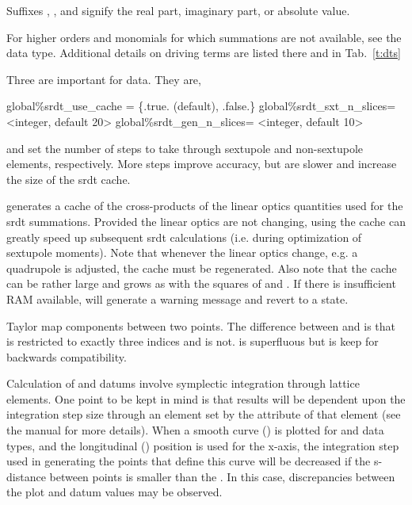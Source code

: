 \begin{description}
{  Suffixes , , and  signify the real part, imaginary part, or absolute value.

  For higher orders and monomials for which summations are not available, see the \Newline
   data type.
  Additional details on driving terms are listed there and in Tab.~\ref{t:dts}

  Three   are important for  data.  They are,
  \begin{example}
  global{\%}srdt_use_cache = \{.true. (default), .false.\}
  global{\%}srdt_sxt_n_slices= <integer, default 20>
  global{\%}srdt_gen_n_slices= <integer, default 10>
  \end{example}

   and  set the number of steps to take through
  sextupole and non-sextupole elements, respectively.  More steps improve accuracy, but are slower
  and increase the size of the srdt cache.

   generates a cache of the cross-products of the linear optics quantities used
  for the srdt summations.  Provided the linear optics are not changing, using the cache can greatly 
  speed up subsequent srdt calculations (i.e. during optimization of sextupole moments).  
  Note that whenever the linear optics change, e.g. a quadrupole
  is adjusted, the cache must be regenerated.  Also note that the cache can be rather large and grows as
  with the squares of  and .  If there is insufficient RAM available,  will
  generate a warning message and revert to a  state.

  \item[t.$ijk$,  tt.$ijklm\ldots$ \hspace{0.2in} $1 \le i,j,k,\ldots \le 6$] \Newline
Taylor map components between two points.  The difference between  and
 is that  is restricted to exactly three indices and
 is not.  is superfluous but is keep for backwards compatibility.

Calculation of  and  datums involve symplectic
integration through lattice elements. One point to be kept in mind is that results will be
dependent upon the integration step size through an element set by the 
attribute of that element (see the \bmad manual for more details). When a smooth curve
() is plotted for  and  data types, and
the longitudinal () position is used for the x-axis, the integration step used in
generating the points that define this curve will be decreased if the s-distance between
points is smaller than the .  In this case, discrepancies between the plot and
datum values may be observed.

}
\end{description}
